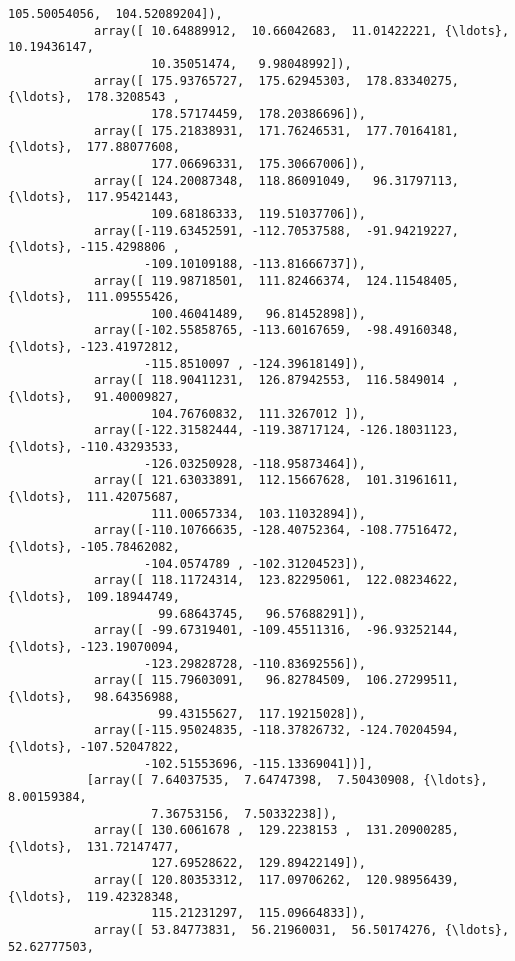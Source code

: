 \documentclass[11pt]{article}
\begin{document}
\begin{Verbatim}[commandchars=\\\{\}]
                    105.50054056,  104.52089204]),
            array([ 10.64889912,  10.66042683,  11.01422221, {\ldots},  10.19436147,
                    10.35051474,   9.98048992]),
            array([ 175.93765727,  175.62945303,  178.83340275, {\ldots},  178.3208543 ,
                    178.57174459,  178.20386696]),
            array([ 175.21838931,  171.76246531,  177.70164181, {\ldots},  177.88077608,
                    177.06696331,  175.30667006]),
            array([ 124.20087348,  118.86091049,   96.31797113, {\ldots},  117.95421443,
                    109.68186333,  119.51037706]),
            array([-119.63452591, -112.70537588,  -91.94219227, {\ldots}, -115.4298806 ,
                   -109.10109188, -113.81666737]),
            array([ 119.98718501,  111.82466374,  124.11548405, {\ldots},  111.09555426,
                    100.46041489,   96.81452898]),
            array([-102.55858765, -113.60167659,  -98.49160348, {\ldots}, -123.41972812,
                   -115.8510097 , -124.39618149]),
            array([ 118.90411231,  126.87942553,  116.5849014 , {\ldots},   91.40009827,
                    104.76760832,  111.3267012 ]),
            array([-122.31582444, -119.38717124, -126.18031123, {\ldots}, -110.43293533,
                   -126.03250928, -118.95873464]),
            array([ 121.63033891,  112.15667628,  101.31961611, {\ldots},  111.42075687,
                    111.00657334,  103.11032894]),
            array([-110.10766635, -128.40752364, -108.77516472, {\ldots}, -105.78462082,
                   -104.0574789 , -102.31204523]),
            array([ 118.11724314,  123.82295061,  122.08234622, {\ldots},  109.18944749,
                     99.68643745,   96.57688291]),
            array([ -99.67319401, -109.45511316,  -96.93252144, {\ldots}, -123.19070094,
                   -123.29828728, -110.83692556]),
            array([ 115.79603091,   96.82784509,  106.27299511, {\ldots},   98.64356988,
                     99.43155627,  117.19215028]),
            array([-115.95024835, -118.37826732, -124.70204594, {\ldots}, -107.52047822,
                   -102.51553696, -115.13369041])],
           [array([ 7.64037535,  7.64747398,  7.50430908, {\ldots},  8.00159384,
                    7.36753156,  7.50332238]),
            array([ 130.6061678 ,  129.2238153 ,  131.20900285, {\ldots},  131.72147477,
                    127.69528622,  129.89422149]),
            array([ 120.80353312,  117.09706262,  120.98956439, {\ldots},  119.42328348,
                    115.21231297,  115.09664833]),
            array([ 53.84773831,  56.21960031,  56.50174276, {\ldots},  52.62777503,

\end{Verbatim}
\end{document}
